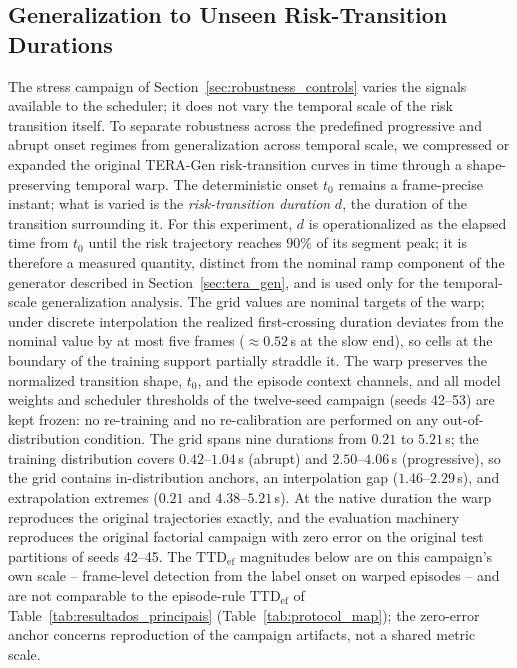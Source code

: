 \documentclass[a4paper,fleqn]{cas-dc}
\newcommand{\TERAGen}{\mbox{TERA-Gen}\xspace}
\begin{document}
{\color{\revcolor}
\subsection{Generalization to Unseen Risk-Transition Durations}
\label{sec:temporal_scale}
The stress campaign of Section~\ref{sec:robustness_controls} varies the
signals available to the scheduler; it does not vary the temporal scale of
the risk transition itself. To separate robustness across the predefined
progressive and abrupt onset regimes from generalization across temporal
scale, we compressed or expanded the original \TERAGen risk-transition
curves in time through a shape-preserving temporal warp. The deterministic
onset $t_0$ remains a frame-precise instant; what is varied is the
\emph{risk-transition duration} $d$, the duration of the transition
surrounding it. For this experiment, $d$ is operationalized as the elapsed
time from $t_0$ until the risk trajectory reaches $90\%$ of its segment
peak; it is therefore a measured quantity, distinct from the nominal ramp
component of the generator described in Section~\ref{sec:tera_gen}, and is
used only for the temporal-scale generalization analysis. The grid values are
nominal targets of the warp; under discrete interpolation the realized
first-crossing duration deviates from the nominal value by at most five
frames ($\approx$$0.52$\,s at the slow end), so cells at the boundary of the
training support partially straddle it. The warp preserves the normalized transition shape, $t_0$,
and the episode context channels, and all model weights and scheduler
thresholds of the twelve-seed campaign (seeds 42--53) are kept frozen: no
re-training and no re-calibration are performed on any out-of-distribution
condition. The grid spans nine durations from $0.21$ to $5.21$\,s; the
training distribution covers $0.42$--$1.04$\,s (abrupt) and
$2.50$--$4.06$\,s (progressive), so the grid contains in-distribution
anchors, an interpolation gap ($1.46$--$2.29$\,s), and extrapolation
extremes ($0.21$ and $4.38$--$5.21$\,s). At the native duration the warp
reproduces the original trajectories exactly, and the evaluation machinery
reproduces the original factorial campaign with zero error on the original
test partitions of seeds 42--45. {\color{\revcolor}The
$\mathrm{TTD}_{\mathrm{ef}}$ magnitudes below are on this campaign's own
scale -- frame-level detection from the label onset on warped episodes -- and
are not comparable to the episode-rule $\mathrm{TTD}_{\mathrm{ef}}$ of
Table~\ref{tab:resultados_principais}
(Table~\ref{tab:protocol_map}); the zero-error anchor concerns reproduction
of the campaign artifacts, not a shared metric scale.}

}
\end{document}
